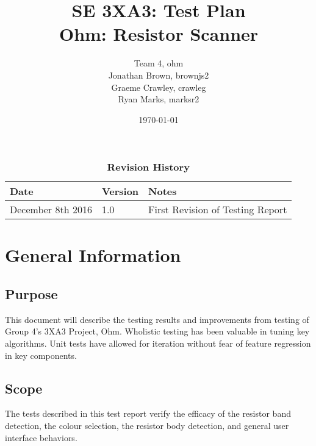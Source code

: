 \documentclass[12pt, titlepage]{article}
\title{SE 3XA3: Test Plan\\ Ohm: Resistor Scanner}
\author{Team 4, ohm
		\\ Jonathan Brown, brownjs2
		\\ Graeme Crawley, crawleg
		\\ Ryan Marks, marksr2
}
\date{\today}
\begin{document}
\maketitle
{}
\tableofcontents
\newpage
\listoftables
\begin{table}[h]
\caption{\bf Revision History}
\begin{tabularx}{\textwidth}{p{3cm}p{2cm}X}
\toprule {\bf Date} & {\bf Version} & {\bf Notes}\\
\midrule
December 8th 2016 & 1.0 & First Revision of Testing Report\\
\bottomrule
\end{tabularx}
\end{table}
\newpage
{}
\section{General Information}
\subsection{Purpose}
\par This document will describe the testing results and improvements from testing of Group 4's 3XA3 Project, Ohm.
Wholistic testing has been valuable in tuning key algorithms.
Unit tests have allowed for iteration without fear of feature regression in key components.
\subsection{Scope}
\par The tests described in this test report verify the efficacy of the resistor band detection, the colour selection, the resistor body detection, and general user interface behaviors.

	
\end{document}
